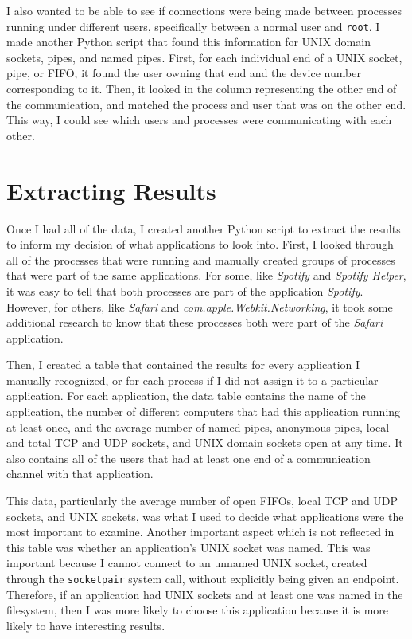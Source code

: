 I also wanted to be able to see if connections were being made between processes running under different users, specifically between a normal user and \texttt{root}.  I made another Python script that found this information for UNIX domain sockets, pipes, and named pipes.  First, for each individual end of a UNIX socket, pipe, or FIFO, it found the user owning that end and the device number corresponding to it.  Then, it looked in the column representing the other end of the communication, and matched the process and user that was on the other end.  This way, I could see which users and processes were communicating with each other.

\section{Extracting Results}
\label{sec:extractResults}
Once I had all of the data, I created another Python script to extract the results to inform my decision of what applications to look into.  First, I  looked through all of the processes that were running and manually created groups of processes that were part of the same applications.  For some, like \textit{Spotify} and \textit{Spotify Helper}, it was easy to tell that both processes are part of the application \textit{Spotify}.  However, for others, like \textit{Safari} and \textit{com.apple.Webkit.Networking}, it took some additional research to know that these processes both were part of the \textit{Safari} application.

Then, I created a table that contained the results for every application I manually recognized, or for each process if I did not assign it to a particular application.  For each application, the data table contains the name of the application, the number of different computers that had this application running at least once, and the average number of named pipes, anonymous pipes, local and total TCP and UDP sockets, and UNIX domain sockets open at any time.  It also contains all of the users that had at least one end of a communication channel with that application.

This data, particularly the average number of open FIFOs, local TCP and UDP sockets, and UNIX sockets, was what I used to decide what applications were the most important to examine.  Another important aspect which is not reflected in this table was whether an application's UNIX socket was named.  This was important because I cannot connect to an unnamed UNIX socket, created through the \texttt{socketpair} system call, without explicitly being given an endpoint.  Therefore, if an application had UNIX sockets and at least one was named in the filesystem, then I was more likely to choose this application because it is more likely to have interesting results.

